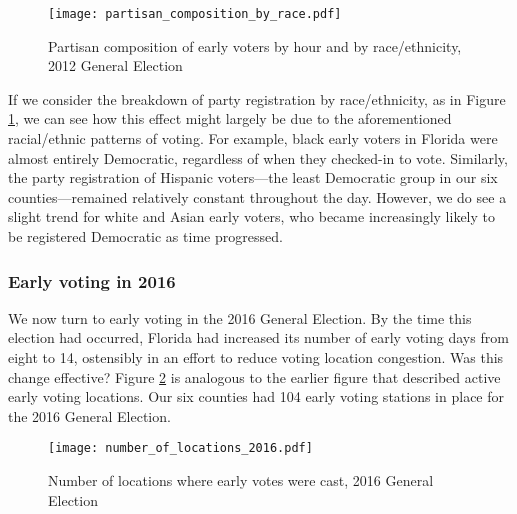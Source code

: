 \documentclass[12pt,titlepage]{article}
\begin{document}
\begin{figure}[!ht]
\caption{Partisan composition of early voters by hour and by race/ethnicity, 2012
  General Election}
  \label{fig:party2012}
  \centering
    \centering\texttt{[image: partisan\_composition\_by\_race.pdf]}
\end{figure}

%

If we consider the breakdown of party registration by race/ethnicity,
as in Figure \ref{fig:party2012}, we can see how this effect might
largely be due to the aforementioned racial/ethnic patterns of voting.
For example, black early voters in Florida were almost entirely
Democratic, regardless of when they checked-in to vote.  Similarly,
the party registration of Hispanic voters---the least Democratic group
in our six counties---remained relatively constant throughout the day.
However, we do see a slight trend for white and Asian early voters, who
became increasingly likely to be registered Democratic as time
progressed.


\subsubsection*{Early voting in 2016}

We now turn to early voting in the 2016 General Election.  By the time
this election had occurred, Florida had increased its number of early
voting days from eight to 14, ostensibly in an effort to reduce voting
location congestion. Was this change effective?  Figure
\ref{fig:nrlocs2016} is analogous to the earlier figure that described
active early voting locations. Our six counties had 104 early voting
stations in place for the 2016 General Election.


\begin{figure}[!ht]
  \caption{Number of locations where early votes were cast, 2016 General
    Election}
  \label{fig:nrlocs2016}
  \centering
    \centering\texttt{[image: number\_of\_locations\_2016.pdf]}
\end{figure}
\end{document}
